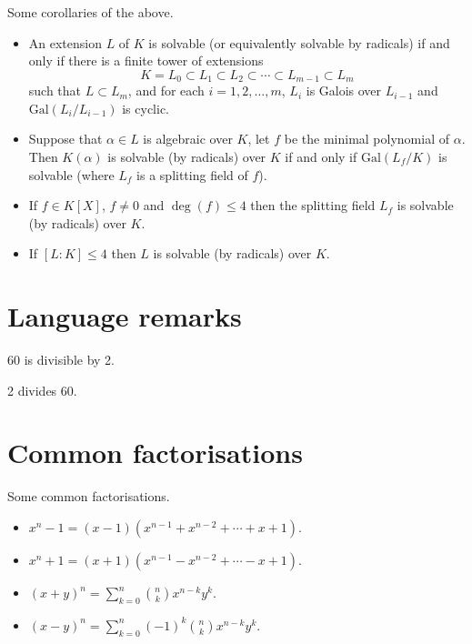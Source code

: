 \documentclass[12pt, a4paper]{article}
\begin{document}
\begin{corollary}
    Some corollaries of the above.
    \begin{itemize}
        \item  An extension \( L \) of \( K \) is solvable (or equivalently solvable by radicals) if and only if there is a finite tower of extensions
        \[ K = L_0 \subset L_1 \subset L_2 \subset \cdots \subset L_{m-1} \subset L_m \]
        such that \( L \subset L_m \), and for each \( i = 1, 2, \ldots, m \), \( L_i \) is Galois over \( L_{i-1} \) and \( \text{Gal}(L_i / L_{i-1}) \) is cyclic.
        \item Suppose that \( \alpha \in L \) is algebraic over \( K \), let \( f \) be the minimal polynomial of \( \alpha \). Then \( K(\alpha) \) is solvable (by radicals) over \( K \) if and only if \( \text{Gal}(L_f / K) \) is solvable (where \( L_f \) is a splitting field of \( f \)).        
        \item If \(f \in K[X]\), \(f\neq 0\) and \(\deg(f)\leq 4\) then the splitting field \(L_f\) is solvable (by radicals) over \(K\). 
        \item If \([L:K] \leq 4\) then \(L\) is solvable (by radicals) over \(K\).
    \end{itemize}
\end{corollary}






\pagebreak

\appendix

\section{Language remarks}

60 is divisible by 2.

2 divides 60.

\section{Common factorisations}

\begin{mdprop}
    Some common factorisations.
    \begin{itemize}
        \item \(x^n - 1 = (x - 1)(x^{n-1} + x^{n-2} + \cdots + x + 1)\).
        \item \(x^n + 1 = (x + 1)(x^{n-1} - x^{n-2} + \cdots - x + 1)\).
        \item \((x + y)^n = \sum_{k=0}^{n} \binom{n}{k} x^{n-k}y^k\).
        \item \((x - y)^n = \sum_{k=0}^{n} (-1)^k \binom{n}{k} x^{n-k}y^k\).
    \end{itemize}
\end{mdprop}
\end{document}
